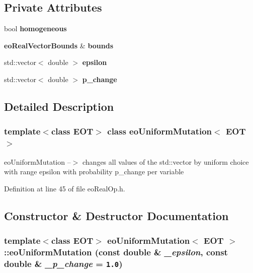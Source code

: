 \subsection*{Private Attributes}
\begin{CompactItemize}
\item 
bool {\bf homogeneous}\label{classeo_uniform_mutation_r0}

\item 
{\bf eo\-Real\-Vector\-Bounds} \& {\bf bounds}\label{classeo_uniform_mutation_r1}

\item 
std::vector$<$ double $>$ {\bf epsilon}\label{classeo_uniform_mutation_r2}

\item 
std::vector$<$ double $>$ {\bf p\_\-change}\label{classeo_uniform_mutation_r3}

\end{CompactItemize}


\subsection{Detailed Description}
\subsubsection*{template$<$class EOT$>$ class eo\-Uniform\-Mutation$<$ EOT $>$}

eo\-Uniform\-Mutation --$>$ changes all values of the std::vector by uniform choice with range epsilon with probability p\_\-change per variable 



Definition at line 45 of file eo\-Real\-Op.h.

\subsection{Constructor \& Destructor Documentation}
\subsubsection{\setlength{\rightskip}{0pt plus 5cm}template$<$class EOT$>$ {\bf eo\-Uniform\-Mutation}$<$ {\bf EOT} $>$::{\bf eo\-Uniform\-Mutation} (const double \& {\em \_\-epsilon}, const double \& {\em \_\-p\_\-change} = {\tt 1.0})\hspace{0.3cm}{\tt  [inline]}}\label{classeo_uniform_mutation_a0}


